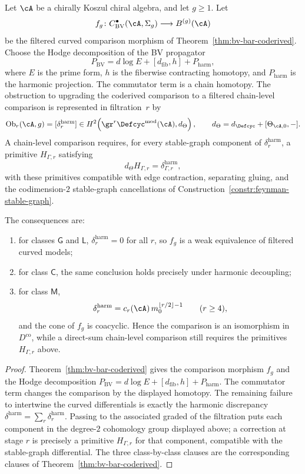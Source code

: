 \begin{theorem}
\label{thm:interacting-bv-bar-obstruction}
Let $\cA$ be a chirally Koszul chiral algebra, and let
$g\geq 1$.  Let
\[
f_g\colon C^\bullet_{\mathrm{BV}}(\cA,\Sigma_g)\longrightarrow
B^{(g)}(\cA)
\]
be the filtered curved comparison morphism of
Theorem~\ref{thm:bv-bar-coderived}.  Choose the Hodge decomposition of
the BV propagator
\[
P_{\mathrm{BV}}
= d\log E + [d_{\mathrm{fib}},h] + P_{\mathrm{harm}},
\]
where $E$ is the prime form, $h$ is the fiberwise contracting
homotopy, and $P_{\mathrm{harm}}$ is the harmonic projection.  The
commutator term is a chain homotopy.  The obstruction to upgrading
the coderived comparison to a filtered chain-level comparison is
represented in filtration~$r$ by
\[
\operatorname{Ob}_r(\cA,g)
= [\delta_r^{\mathrm{harm}}]
\in
H^2\!\left(
\gr^r\Defcyc^{\mathrm{mod}}(\cA),
d_\Theta
\right),
\qquad
d_\Theta=d_{\Defcyc}+[\Theta_{\cA,0},{-}].
\]
A chain-level comparison requires, for every stable-graph component
of $\delta_r^{\mathrm{harm}}$, a primitive
$H_{\Gamma,r}$ satisfying
\[
d_\Theta H_{\Gamma,r}
=\delta_{\Gamma,r}^{\mathrm{harm}},
\]
with these primitives compatible with edge contraction, separating
gluing, and the codimension-$2$ stable-graph cancellations of
Construction~\ref{constr:feynman-stable-graph}.

The consequences are:
\begin{enumerate}[label=\textup{(\roman*)}]
\item for classes $\mathsf{G}$ and $\mathsf{L}$,
 $\delta_r^{\mathrm{harm}}=0$ for all $r$, so $f_g$ is a weak
 equivalence of filtered curved models;
\item for class $\mathsf{C}$, the same conclusion holds precisely
 under harmonic decoupling;
\item for class $\mathsf{M}$,
 \[
 \delta_r^{\mathrm{harm}}
 =
 c_r(\cA)\,m_0^{\lfloor r/2\rfloor-1}
 \qquad (r\geq 4),
 \]
 and the cone of $f_g$ is coacyclic.  Hence the comparison is an
 isomorphism in $D^{\mathrm{co}}$, while a direct-sum chain-level
 comparison still requires the primitives $H_{\Gamma,r}$ above.
\end{enumerate}
\end{theorem}

\begin{proof}
Theorem~\ref{thm:bv-bar-coderived} gives the comparison morphism
$f_g$ and the Hodge decomposition
$P_{\mathrm{BV}}=d\log E+[d_{\mathrm{fib}},h]+P_{\mathrm{harm}}$.
The commutator term changes the comparison by the displayed
homotopy.  The remaining failure to intertwine the curved
differentials is exactly the harmonic discrepancy
$\delta^{\mathrm{harm}}=\sum_r\delta_r^{\mathrm{harm}}$.  Passing to
the associated graded of the filtration puts each component in the
degree-$2$ cohomology group displayed above; a correction at stage
$r$ is precisely a primitive $H_{\Gamma,r}$ for that component,
compatible with the stable-graph differential.  The three
class-by-class clauses are the corresponding clauses of
Theorem~\ref{thm:bv-bar-coderived}.
\end{proof}

